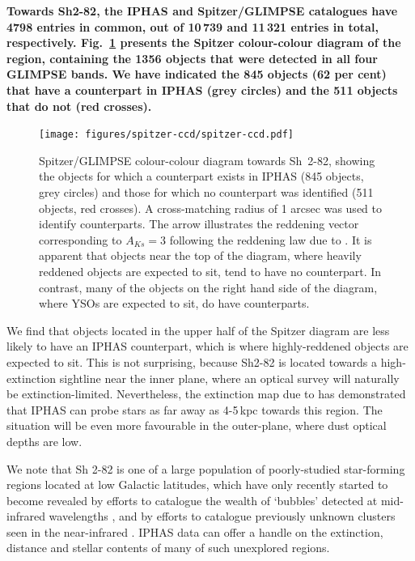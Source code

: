 \documentclass[a4paper,useAMS,usenatbib]{mn2e}
\begin{document}
{\bf Towards Sh2-82,
the IPHAS and Spitzer/GLIMPSE catalogues
have 4798 entries in common,
out of 10\,739 and 11\,321 entries in total, respectively.
Fig.~\ref{fig:spitzer-ccd} presents the Spitzer colour-colour diagram
of the region, containing the 1356 objects that were detected 
in all four GLIMPSE bands.
We have indicated the 845 objects (62 per cent)
that have a counterpart in IPHAS (grey circles)
and the 511 objects that do not (red crosses).

\begin{figure}
    \texttt{[image: figures/spitzer-ccd/spitzer-ccd.pdf]} 
    \caption{Spitzer/GLIMPSE colour-colour diagram towards Sh~2-82,
    showing the objects for which a counterpart exists in IPHAS
    (845 objects, grey circles) 
    and those for which no counterpart was identified 
    (511 objects, red crosses).
    A cross-matching radius of 1 arcsec
    was used to identify counterparts.
    The arrow illustrates the reddening vector corresponding
    to $A_{Ks}=3$ following the reddening law due to \citet{Flaherty2007}.
    It is apparent that objects near the top of the diagram,
    where heavily reddened objects are expected to sit,
    tend to have no counterpart.
    In contrast, many of the objects on the right hand side of the diagram,
    where YSOs are expected to sit, do have counterparts.
    }
    \label{fig:spitzer-ccd}
\end{figure}

We find that objects located in the upper half of the Spitzer diagram
are less likely to have an IPHAS counterpart,
which is where highly-reddened objects are expected to sit.
This is not surprising,
because Sh2-82 is located 
towards a high-extinction sightline 
near the inner plane,
where an optical survey will naturally be extinction-limited.
Nevertheless, the extinction map due to \citet{Sale2014}
has demonstrated that IPHAS can probe stars as far away 
as 4-5\,kpc towards this region.
The situation will be even more favourable
in the outer-plane, where dust optical depths are low.

We note that Sh 2-82 is one of a large population 
of poorly-studied star-forming regions
located at low Galactic latitudes,
which have only recently started to become revealed
by efforts to catalogue the wealth of `bubbles' detected
at mid-infrared wavelengths \citep{Churchwell2006,Simpson2012},
and by efforts to catalogue previously unknown clusters seen 
in the near-infrared \cite[e.g.][]{Bica2003}.
IPHAS data can offer a handle
on the extinction, distance
and stellar contents of many of such unexplored regions.
}
\end{document}
